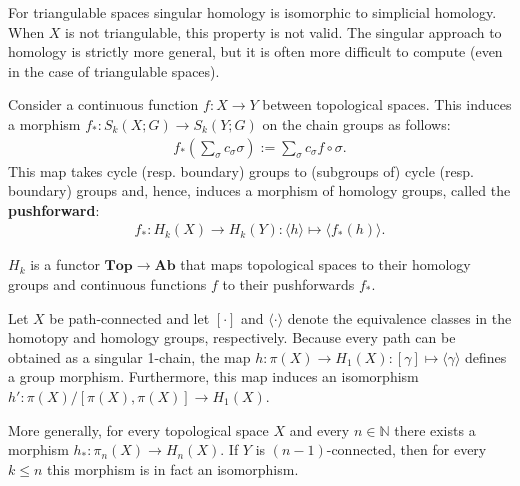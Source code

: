     \begin{property}
        For triangulable spaces singular homology is isomorphic to simplicial homology. When $X$ is not triangulable, this property is not valid. The singular approach to homology is strictly more general, but it is often more difficult to compute (even in the case of triangulable spaces).
    \end{property}

    \begin{property}\label{topology:pushforward}
        Consider a continuous function $f:X\rightarrow Y$ between topological spaces. This induces a morphism $f_*:S_k(X;G)\rightarrow S_k(Y;G)$ on the chain groups as follows:
        \begin{gather}
            f_*\left(\sum_\sigma c_\sigma\sigma\right) := \sum_\sigma c_\sigma f\circ\sigma.
        \end{gather}
        This map takes cycle (resp. boundary) groups to (subgroups of) cycle (resp. boundary) groups and, hence, induces a morphism of homology groups, called the \textbf{pushforward}:
        \begin{gather}
            f_\ast:H_k(X)\rightarrow H_k(Y):\langle h \rangle\mapsto\langle f_*(h)\rangle.
        \end{gather}
    \end{property}
    \begin{result}
        $H_k$ is a functor $\mathbf{Top}\rightarrow\mathbf{Ab}$ that maps topological spaces to their homology groups and continuous functions $f$ to their pushforwards $f_\ast$.
    \end{result}

    \begin{theorem}[Hurewicz]
        Let $X$ be path-connected and let $[\cdot]$ and $\langle\cdot\rangle$ denote the equivalence classes in the homotopy and homology groups, respectively. Because every path can be obtained as a singular 1-chain, the map $h:\pi(X)\rightarrow H_1(X):[\gamma]\mapsto\langle\gamma\rangle$ defines a group morphism. Furthermore, this map induces an isomorphism $h':\pi(X)/[\pi(X), \pi(X)]\rightarrow H_1(X)$.

        More generally, for every topological space $X$ and every $n\in\mathbb{N}$ there exists a morphism $h_*:\pi_n(X)\rightarrow H_n(X)$. If $Y$ is $(n-1)$-connected, then for every $k\leq n$ this morphism is in fact an isomorphism.
    \end{theorem}


